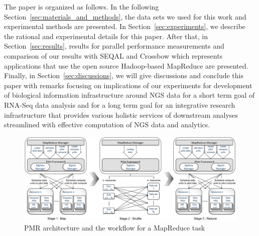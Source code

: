 \documentclass{acm_proc_article-sp}
\begin{document}
The paper is organized as follows. In the following
Section~\ref{sec:materials_and_methods}, the data sets we used for
this work and experimental methods are presented.  In
Section~\ref{sec:experiments}, we describe the rational and
experimental details for this paper.  After that, in
Section~\ref{sec:results}, results for parallel performance
measurements and comparison of our results with SEQAL and Crossbow
which represents applications that use the open source Hadoop-based
MapReduce\cite{hadoop-url, taylor2010,seal_2011_mapred,seal2011} are
presented.  Finally, in Section~\ref{sec:discussions}, we will give
discussions and conclude this paper with remarks focusing on
implications of our experiments for development of biological
information infrastructure around NGS data for a short term goal of
RNA-Seq data analysis and for a long term goal for an integrative
research infrastructure that provides various holistic services of
downstream analyses streamlined with effective computation of NGS data
and analytics.

\begin{center}
\hfill{}
\begin{figure}
 \centering
\includegraphics[scale=0.35]{figures/F1_1.pdf} 
\hfill{}
\caption{\small PMR architecture and the workflow for a MapReduce task}
  \label{fig:arch-pj-saga-mr} 
\end{figure}
\end{center}

\end{document}
